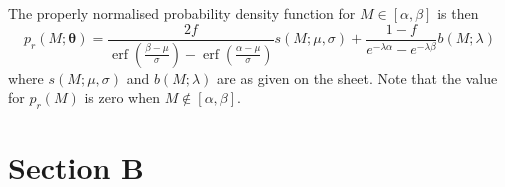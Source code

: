 \documentclass[12pt]{article}
\DeclareMathOperator{\erf}{erf}
\begin{document}
The properly normalised probability density function for $M\in[\alpha,\beta]$ is then
\[
    p_r(M;\boldsymbol{\theta}) = \frac{2f}{\erf\left(\frac{\beta - \mu}{\sigma}\right) - \erf\left(\frac{\alpha - \mu}{\sigma}\right)}s(M;\mu,\sigma) + \frac{1-f}{e^{-\lambda\alpha} - e^{-\lambda\beta}}b(M;\lambda)
\]
where $s(M;\mu,\sigma)$ and $b(M;\lambda)$ are as given on the sheet. Note that the value for $p_r(M)$ is zero when $M\notin[\alpha,\beta]$.
\section{Section B}
\end{document}
